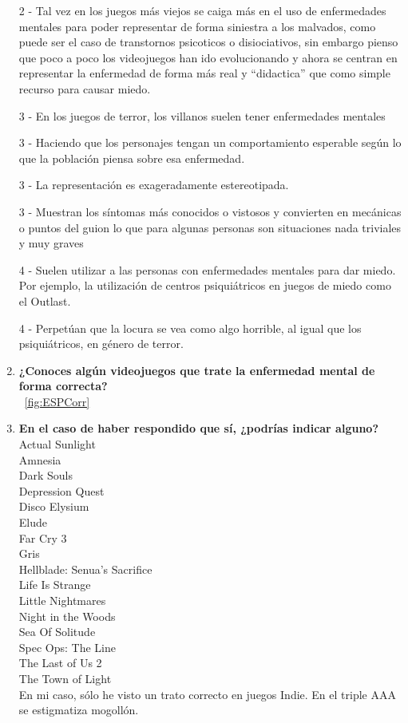 \documentclass[12pt, a4paper,twoside,titlepage]{book}
\begin{document}
\begin{enumerate}[label=\textbf{\arabic*}.]
    2 - Tal vez en los juegos más viejos se caiga más en el uso de enfermedades mentales para poder representar de forma siniestra a los malvados, como puede ser el caso de transtornos psicoticos o disiociativos, sin embargo pienso que poco a poco los videojuegos han ido evolucionando y ahora se centran en representar la enfermedad de forma más real y ``didactica'' que como simple recurso para causar miedo.
    
    3 - En los juegos de terror, los villanos suelen tener enfermedades mentales
    
    3 - Haciendo que los personajes tengan un comportamiento esperable según lo que la población piensa sobre esa enfermedad.
    
    3 - La representación es exageradamente estereotipada.
    
    3 - Muestran los síntomas más conocidos o vistosos y convierten en mecánicas o puntos del guion lo que para algunas personas son situaciones nada triviales y muy graves
    
    4 - Suelen utilizar a las personas con enfermedades mentales para dar miedo. Por ejemplo, la utilización de centros psiquiátricos en juegos de miedo como el Outlast.
    
    4 - Perpetúan que la locura se vea como algo horrible, al igual que los psiquiátricos, en género de terror.

    
     \item \textbf{¿Conoces algún videojuegos que trate la enfermedad mental de forma correcta? }\\
    ~\ref{fig:ESPCorr}
     \item \textbf{En el caso de haber respondido que sí, ¿podrías indicar alguno?}\\
    
    Actual Sunlight\\
    Amnesia\\
    Dark Souls\\
    Depression Quest \\
    Disco Elysium\\
    Elude\\
    Far Cry 3\\
    Gris\\
    Hellblade: Senua’s Sacrifice\\
    Life Is Strange\\
    Little Nightmares\\
    Night in the Woods\\
    Sea Of Solitude\\
    Spec Ops: The Line\\
    The Last of Us 2\\
    The Town of Light\\
    En mi caso, sólo he visto un trato correcto en juegos Indie. En el triple AAA se estigmatiza mogollón.


\end{enumerate}
\end{document}
